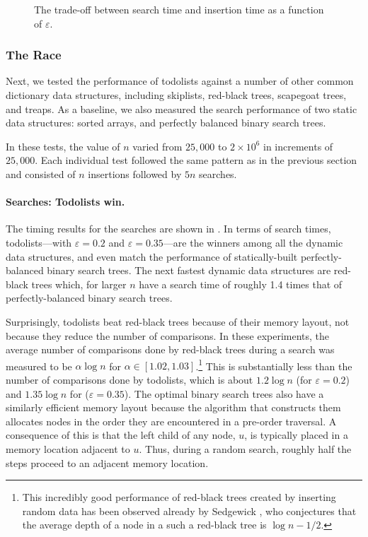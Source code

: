 \documentclass{patmorin}
\newcommand{\eps}{\varepsilon}
\begin{document}
\begin{figure}
{
 }
  \caption{The trade-off between search time and insertion time as a function of $\eps$.}
\end{figure}

\subsubsection{The Race}

Next, we tested the performance of todolists against a number of other
common dictionary data structures, including skiplists, red-black trees,
scapegoat trees, and treaps. As a baseline, we also measured the search
performance of two static data structures: sorted arrays, and perfectly
balanced binary search trees.

In these tests, the value of $n$ varied from $25,000$ to $2\times 10^6$
in increments of $25,000$.   Each individual test followed the same
pattern as in the previous section and consisted of $n$ insertions
followed by $5n$ searches.

\paragraph{Searches: Todolists win.}
The timing results for the searches are shown in . In
terms of search times, todolists---with $\eps = 0.2$ and $\eps=0.35$---are
the winners among all the dynamic data structures, and even match the
performance of statically-built perfectly-balanced binary search trees.
The next fastest dynamic data structures are red-black trees which,
for larger $n$ have a search time of roughly 1.4 times that of
perfectly-balanced binary search trees.

Surprisingly, todolists beat red-black trees because of their memory
layout, not because they reduce the number of comparisons. In
these experiments, the average number of comparisons done by
red-black trees during a search was measured to be $\alpha\log n$
for $\alpha\in[1.02,1.03]$.\footnote{This incredibly good performance
of red-black trees created by inserting random data has been observed
already by Sedgewick \cite{sedgewick:left-leaning}, who conjectures
that the average depth of a node in a such a red-black tree is $\log
n-1/2$.} This is substantially less than the number of comparisons done
by todolists, which is about $1.2\log n$ (for $\eps=0.2$) and $1.35\log
n$ for ($\eps=0.35$). The optimal binary search trees also have a
similarly efficient memory layout because the algorithm that constructs
them allocates nodes in the order they are encountered in a pre-order
traversal. A consequence of this is that the left child of any node,
$u$, is typically placed in a memory location adjacent to $u$.  Thus,
during a random search, roughly half the steps proceed to an adjacent
memory location.
\end{document}
